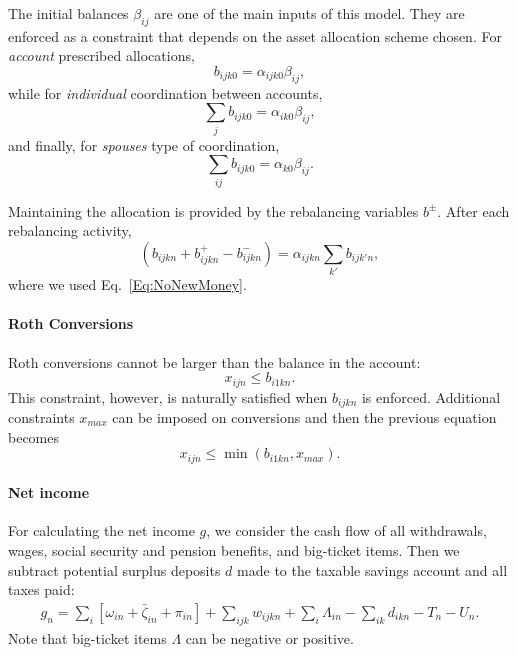 \documentclass{article}[fleqn,12pt]
\begin{document}
	The initial balances $\beta_{ij}$ are one of the main inputs of this model. They are
	enforced as a constraint that depends on the asset allocation scheme chosen.
	For {\em account} prescribed allocations,
	\begin{equation}
		\label{Eq:AccountCoord}
		b_{ijk0} =  \alpha_{ijk0}\beta_{ij},
	\end{equation}
	while for {\em individual} coordination between accounts,
	\begin{equation}
		\sum_j b_{ijk0} = \alpha_{ik0}\beta_{ij},
	\end{equation}
	and finally, for {\em spouses} type of coordination,
	\begin{equation}
		\label{Eq:SpouseCoord}
		\sum_{ij} b_{ijk0} = \alpha_{k0}\beta_{ij}.
	\end{equation}

	Maintaining the allocation is provided by the rebalancing variables $b^\pm$. After each
	rebalancing activity,
	\begin{equation}
		\label{Eq:Rebalance}
		(b_{ijkn} + b^+_{ijkn} - b^-_{ijkn}) = \alpha_{ijkn}\sum_{k'} b_{ijk'n},
	\end{equation}
	where we used Eq.~\ref{Eq:NoNewMoney}.

\paragraph*{Roth Conversions}
	Roth conversions cannot be larger than the balance in the account:
	\begin{equation}
		x_{ijn} \le b_{i1kn}.
	\end{equation}
	This constraint, however, is naturally satisfied when $b_{ijkn}$ is enforced.
	Additional constraints $x_{max}$ can be imposed on conversions and then the previous equation
	becomes
	\begin{equation}
		x_{ijn} \le \min(b_{i1kn}, x_{max}).
	\end{equation}

\paragraph*{Net income}
	For calculating the net income $g$, we consider the cash flow of all withdrawals,
	wages, social security and pension benefits, and big-ticket items. 
	Then we subtract potential surplus deposits $d$ made to the taxable savings account
	and all taxes paid:
	\begin{eqnarray}
		g_n = \sum_i [\omega_{in} + \bar{\zeta}_{in} + \pi_{in} ] 
		+ \sum_{ijk} w_{ijkn} + \sum_i \Lambda_{in} - \sum_{ik}d_{ikn}
		- T_n - U_n.
	\end{eqnarray}
	Note that big-ticket items $\Lambda$ can be negative or positive.
\end{document}
